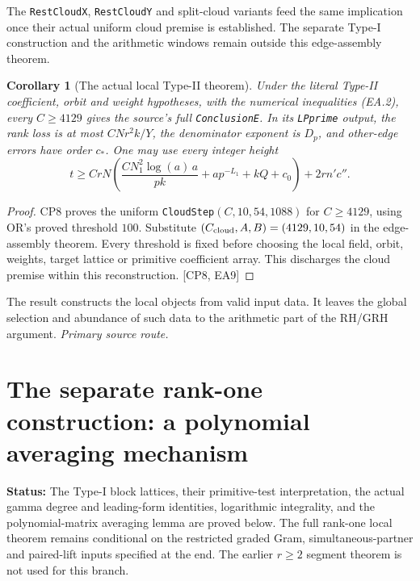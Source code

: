 \documentclass[11pt,a4paper]{article}
\numberwithin{equation}{section}
\newtheorem{corollary}[theorem]{Corollary}
\theoremstyle{remark}\newtheorem{remark}[theorem]{Remark}
\newcommand{\status}[1]{\textbf{Status:} #1}
\begin{document}
The \texttt{RestCloudX}, \texttt{RestCloudY} and split-cloud variants feed
the same implication once their actual uniform cloud premise is established.
The separate Type-I construction and the arithmetic windows remain outside
this edge-assembly theorem.

\begin{corollary}[The actual local Type-II theorem]\label{cor:typeII}
Under the literal Type-II coefficient, orbit and weight hypotheses,
with the numerical inequalities (EA.2), every $C\ge4129$ gives the
source's full \texttt{ConclusionE}. In its \texttt{LPprime} output,
the rank loss is at most $CNr^2k/Y$, the denominator exponent is $D_p$,
and other-edge errors have order $c_*$. One may use every integer height
\[
 t\ge CrN\left(\frac{CN_1^2\log(a)\,a}{pk}
                  +ap^{-L_1}+kQ+c_0\right)+2rn'c''.
\]
\end{corollary}
\begin{proof}
CP8 proves the uniform \texttt{CloudStep}$(C,10,54,1088)$ for
$C\ge4129$, using OR's proved threshold $100$. Substitute
$(C_{\rm cloud},A,B)=(4129,10,54)$ in the edge-assembly theorem.
Every threshold is fixed before choosing the local field, orbit, weights,
target lattice or primitive coefficient array. This discharges the
cloud premise within this reconstruction. \textsf{[CP8, EA9]}
\end{proof}
The result constructs the local objects from valid input data. It leaves
the global selection and abundance of such data to the arithmetic part
of the RH/GRH argument.
\noindent\textit{Primary source route.}\cite{edges-actual}


\section{The separate rank-one construction: a polynomial averaging mechanism}
\label{sec:type-one}

\status{The Type-I block lattices, their primitive-test interpretation, the
actual gamma degree and leading-form identities, logarithmic integrality,
and the polynomial-matrix averaging lemma are proved below.
The full rank-one local theorem remains conditional on the restricted
graded Gram, simultaneous-partner and paired-lift inputs specified at the end.
The earlier $r\geq2$ segment theorem is not used for this branch.}
\end{document}
